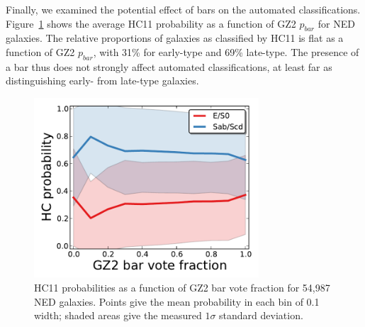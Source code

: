 \documentclass[useAMS,usenatbib]{mn2e}
\begin{document}
Finally, we examined the potential effect of bars on the automated classifications. Figure~\ref{fig-hc_gz2_bar} shows the average HC11 probability as a function of GZ2 $p_{bar}$ for NED galaxies. The relative proportions of galaxies as classified by HC11 is flat as a function of GZ2 $p_{bar}$, with 31\% for early-type and 69\% late-type. The presence of a bar thus does not strongly affect automated classifications, at least far as distinguishing early- from late-type galaxies. 

\begin{figure}
\includegraphics[angle=0,width=3.3in]{figures/hc_gz2_bar.pdf}
\caption{HC11 probabilities as a function of GZ2 bar vote fraction for 54,987 NED galaxies. Points give the mean probability in each bin of 0.1 width; shaded areas give the measured $1\sigma$ standard deviation. 
\label{fig-hc_gz2_bar}}
\end{figure}

%


%
\end{document}
